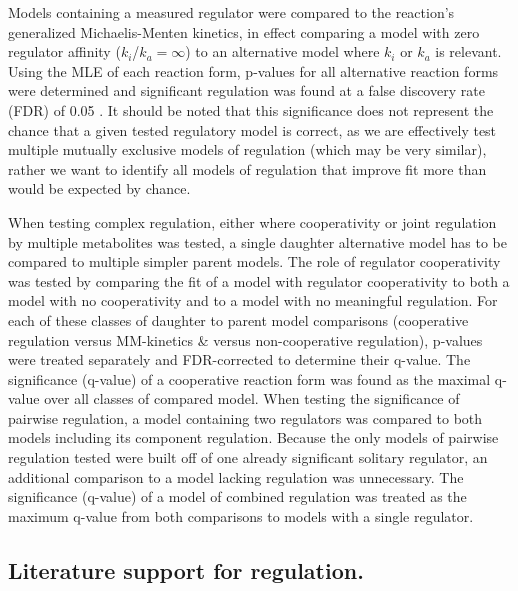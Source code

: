 Models containing a measured regulator were compared to the reaction's generalized Michaelis-Menten kinetics, in effect comparing a model with zero regulator affinity ($k_{i}$/$k_{a} = \infty$) to an alternative model where $k_{i}$ or $k_{a}$ is relevant.  Using the MLE of each reaction form, p-values for all alternative reaction forms were determined and significant regulation was found at a false discovery rate (FDR) of 0.05 \cite{Storey:2003cj}.  It should be noted that this significance does not represent the chance that a given tested regulatory model is correct, as we are effectively test multiple mutually exclusive models of regulation (which may be very similar), rather we want to identify all models of regulation that improve fit more than would be expected by chance.

When testing complex regulation, either where cooperativity or joint regulation by multiple metabolites was tested, a single daughter alternative model has to be compared to multiple simpler parent models.  The role of regulator cooperativity was tested by comparing the fit of a model with regulator cooperativity to both a model with no cooperativity and to a model with no meaningful regulation.  For each of these classes of daughter to parent model comparisons (cooperative regulation versus MM-kinetics \& versus non-cooperative regulation), p-values were treated separately and FDR-corrected to determine their q-value.  The significance (q-value) of a cooperative reaction form was found as the maximal q-value over all classes of compared model.  When testing the significance of pairwise regulation, a model containing two regulators was compared to both models including its component regulation.  Because the only models of pairwise regulation tested were built off of one already significant solitary regulator, an additional comparison to a model lacking regulation was unnecessary.  The significance (q-value) of a model of combined regulation was treated as the maximum q-value from both comparisons to models with a single regulator.

\subsection{Literature support for regulation.}

